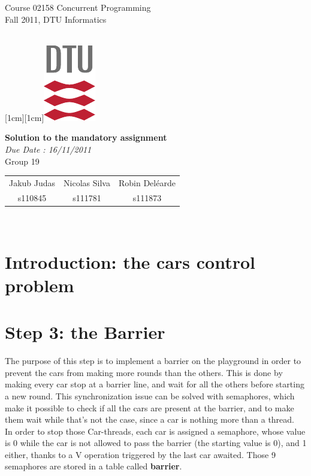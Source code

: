 \documentclass[a4paper,12pt,twoside]{article}
\begin{document}
\noindent\parbox[t]{9cm}{\textsf{Course 02158 Concurrent Programming\\
Fall 2011, DTU Informatics }}
\hfill
\parbox[t]{1cm}{\mbox{}\\
\raisebox{0.0cm}[1cm][1cm]{\includegraphics[origin=lb]{dtu_logo_cmyk.pdf}}}

\vspace{2cm}

\begin{center}
{\Large \bf Solution to the mandatory assignment}\\
\vspace{0.3cm}
{\it Due Date : 16/11/2011}\\
\vspace{1cm}
{\Large Group 19}\\
\vspace{0.3cm}
\begin{tabular}{ccc}
{\large Jakub Judas}&{\large Nicolas Silva}&{\large Robin Del\'earde}\\
s110845&s111781&s111873
\end{tabular}\\
\end{center}

\newpage

\section{Introduction: the cars control problem}




\section{Step 3: the Barrier}
The purpose of this step is to implement a barrier on the playground in order to prevent the cars from making more rounds than the others. This is done by making every car stop at a barrier line, and wait for all the others before starting a new round. This synchronization issue can be solved with semaphores, which make it possible to check if all the cars are present at the barrier, and to make them wait while that's not the case, since a car is nothing more than a thread.\\
In order to stop those Car-threads, each car is assigned a semaphore, whose value is 0 while the car is not allowed to pass the barrier (the starting value is 0), and 1 either, thanks to a V operation triggered by the last car awaited. Those 9 semaphores are stored in a table called \textbf{barrier}.
\end{document}
